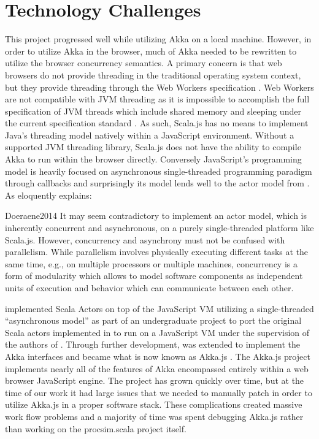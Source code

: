 \section{Technology Challenges}
\label{sec:procsim-scala:technology-challenges}

This project progressed well while utilizing Akka on a local machine. However, in order to utilize Akka in the browser, much of Akka needed to be rewritten to utilize the browser concurrency semantics. A primary concern is that web browsers do not provide threading in the traditional operating system context, but they provide threading through the Web Workers specification \cite{MDN:WebWorkers}. Web Workers are not compatible with JVM threading as it is impossible to accomplish the full specification of JVM threads which include shared memory and sleeping under the current specification standard \cite{MDN:WebWorkers, Doeraene2017}. As such, Scala.js has no means to implement Java's threading model natively within a JavaScript environment. Without a supported JVM threading library, Scala.js does not have the ability to compile Akka to run within the browser directly. Conversely JavaScript's programming model is heavily focused on asynchronous single-threaded programming paradigm through callbacks and surprisingly its model lends well to the actor model from \cite{Agha1985}. As \cite{Doeraene2014} eloquently explains:
\begin{displaycquote}{Doeraene2014}
    It may seem contradictory to implement an actor model, which is inherently concurrent and asynchronous,
    on a purely single-threaded platform like Scala.js. However, concurrency and asynchrony must not be confused with parallelism. While parallelism involves physically executing different tasks at the same time, e.g., on multiple processors or multiple machines, concurrency is a form of modularity which allows to model software components as independent units of execution and behavior which can communicate between each other.
\end{displaycquote}
\cite{Doeraene2014} implemented Scala Actors on top of the JavaScript VM utilizing a single-threaded ``asynchronous model'' as part of an undergraduate project to port the original Scala actors implemented in \cite{Haller2009} to run on a JavaScript VM under the supervision of the authors of \cite{Haller2009}. Through further development, \cite{Doeraene2014} was extended to implement the Akka interfaces and became what is now known as Akka.js \cite{Stivan2015, akka-js2015}. The Akka.js project implements nearly all of the features of Akka encompassed entirely within a web browser JavaScript engine. The project has grown quickly over time, but at the time of our work it had large issues that we needed to manually patch in order to utilize Akka.js in a proper software stack. These complications created massive work flow problems and a majority of time was spent debugging Akka.js rather than working on the procsim.scala project itself.


